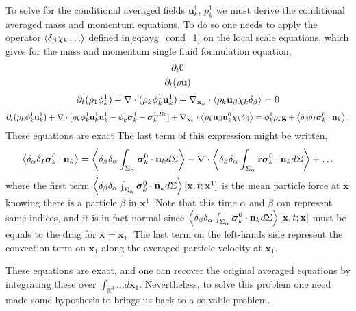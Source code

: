 To solve for the conditional averaged fields $\textbf{u}^1_k$, $p^1_k$ we must derive the conditional averaged mass and momentum equations. 
To do so one needs to apply the operator $\left<\delta_\beta \chi_k \ldots\right>$ defined in\ref{eq:avg_cond_1} on the local scale equations, which gives for the mass and momentum single fluid formulation equation,
\begin{equation*}
    \partial_t  0
\end{equation*}
\begin{equation*}
    \partial_t (\rho \textbf{u})
\end{equation*}
\begin{equation*}
    \partial_t (\rho_1\phi_k^1 )
    + \mathbf{\nabla}\cdot 
        (\rho_k\phi_k^1 \textbf{u}_k^1)
    + \nabla_{\textbf{x}_k}\cdot \left<\rho_k \textbf{u}_\beta \chi_k\delta_\beta\right>
    = 0
\end{equation*}
\begin{equation*}
    \partial_t (\rho_k\phi_k^1 \textbf{u}_k^1)
    + \mathbf{\nabla}\cdot [
        \rho_k\phi_k^1 \textbf{u}_k^1\textbf{u}_k^1
        - \phi_k^1\bm\sigma_k^1
        + \bm\sigma^{1,Re}_k
    ]
    + \nabla_{\textbf{x}_k}\cdot \left<\rho_k \textbf{u}_\beta \textbf{u}_k^0 \chi_k\delta_\beta\right>
    = 
    \phi_k^1 \rho_k \textbf{g}
    + \left<\delta_{\beta} \delta_I
         \bm\sigma_k^0
    \cdot \textbf{n}_k  \right>,
\end{equation*}
These equations are exact 
The last term of this expression might be written, 
\begin{equation*}
    \left<\delta_{\alpha} \delta_I
         \bm\sigma_k^0
    \cdot \textbf{n}_k  \right>
    = 
    \left<\delta_{\beta} 
    \delta_\alpha
    \int_{\Sigma_\alpha} \bm\sigma_k^0
   \cdot \textbf{n}_k  d\Sigma\right>
    - \mathbf{\nabla}\cdot \left<\delta_{\beta} 
    \delta_\alpha
    \int_{\Sigma_\alpha} \textbf{r}\bm\sigma_k^0
   \cdot \textbf{n}_k  d\Sigma\right>
   + \ldots
\end{equation*}
where the first term $\left<\delta_{\beta} 
\delta_\alpha
\int_{\Sigma_\alpha} \bm\sigma_k^0
\cdot \textbf{n}_k  d\Sigma\right>[\textbf{x},t;\textbf{x}^1]$ is the mean particle force at $\textbf{x}$ knowing there is a particle $\beta$ in $\textbf{x}^1$. 
Note that this time $\alpha$ and $\beta$ can represent same indices, and it is in fact normal since $\left<\delta_{\beta} 
\delta_\alpha
\int_{\Sigma_\alpha} \bm\sigma_k^0
\cdot \textbf{n}_k  d\Sigma\right>[\textbf{x},t;\textbf{x}]$
must be equals to the drag for $\textbf{x}=\textbf{x}_1$. 
The last term on the left-hands side represent the convection term on $\textbf{x}_1$ along the averaged particle velocity at $\textbf{x}_1$. 

These equations are exact, and one can recover the original averaged equations by integrating these over $\int_{\mathbb{R}^3}\ldots d\textbf{x}_1$. 
Nevertheless, to solve this problem one need made some hypothesis to brings us back to a solvable problem. 

